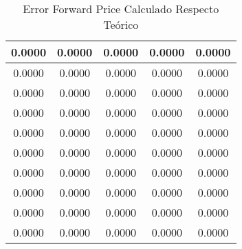 \begin{table}                                
\centering                                   
\begin{tabular}{|c|c|c|c|c|}                 
\hline                                       
0.0000 & 0.0000 & 0.0000 & 0.0000 & 0.0000 \\
\hline                                       
0.0000 & 0.0000 & 0.0000 & 0.0000 & 0.0000 \\
\hline                                       
0.0000 & 0.0000 & 0.0000 & 0.0000 & 0.0000 \\
\hline                                       
0.0000 & 0.0000 & 0.0000 & 0.0000 & 0.0000 \\
\hline                                       
0.0000 & 0.0000 & 0.0000 & 0.0000 & 0.0000 \\
\hline                                       
0.0000 & 0.0000 & 0.0000 & 0.0000 & 0.0000 \\
\hline                                       
0.0000 & 0.0000 & 0.0000 & 0.0000 & 0.0000 \\
\hline                                       
0.0000 & 0.0000 & 0.0000 & 0.0000 & 0.0000 \\
\hline                                       
0.0000 & 0.0000 & 0.0000 & 0.0000 & 0.0000 \\
\hline                                       
0.0000 & 0.0000 & 0.0000 & 0.0000 & 0.0000 \\
\hline                                       
\end{tabular}                                
\caption{Error Forward Price Calculado Respecto Teórico}                     
\label{table:MyTableLabel}                   
\end{table} 

